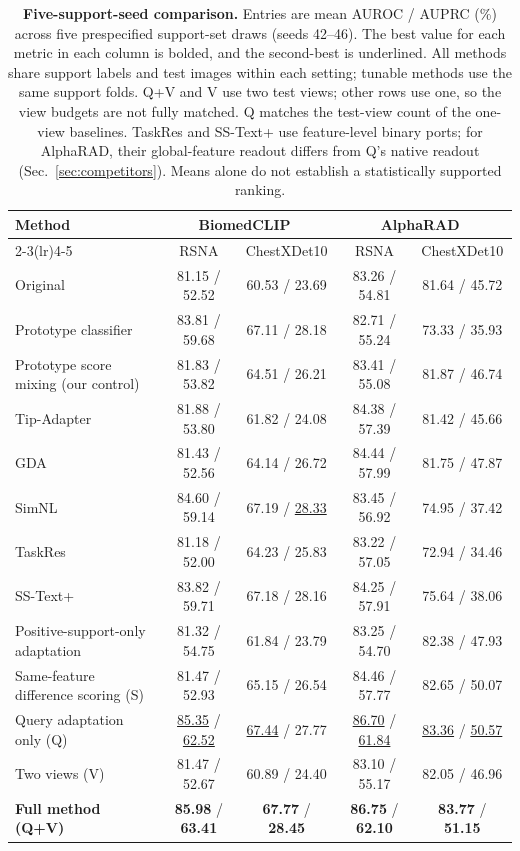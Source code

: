 \begin{table}[t]
\centering
\caption{\textbf{Five-support-seed comparison.} Entries are mean AUROC / AUPRC (\%) across five prespecified support-set draws (seeds 42--46). The best value for each metric in each column is bolded, and the second-best is underlined. All methods share support labels and test images within each setting; tunable methods use the same support folds. Q+V and V use two test views; other rows use one, so the view budgets are not fully matched. Q matches the test-view count of the one-view baselines. TaskRes and SS-Text+ use feature-level binary ports; for AlphaRAD, their global-feature readout differs from Q's native readout (Sec.~\ref{sec:competitors}). Means alone do not establish a statistically supported ranking.}
\label{tab:competitors}
\small
\begin{tabular*}{\textwidth}{@{\extracolsep{\fill}}lcccc}
\toprule
Method & \multicolumn{2}{c}{BiomedCLIP~\cite{biomedclip}} & \multicolumn{2}{c}{AlphaRAD~\cite{alpharad}} \\
\cmidrule(lr){2-3}\cmidrule(lr){4-5}
 & RSNA & ChestXDet10 & RSNA & ChestXDet10 \\
\midrule
Original & 81.15 / 52.52 & 60.53 / 23.69 & 83.26 / 54.81 & 81.64 / 45.72 \\
Prototype classifier~\cite{snell2017prototypical} & 83.81 / 59.68 & 67.11 / 28.18 & 82.71 / 55.24 & 73.33 / 35.93 \\
Prototype score mixing (our control) & 81.83 / 53.82 & 64.51 / 26.21 & 83.41 / 55.08 & 81.87 / 46.74 \\
Tip-Adapter~\cite{tipadapter} & 81.88 / 53.80 & 61.82 / 24.08 & 84.38 / 57.39 & 81.42 / 45.66 \\
GDA~\cite{gda} & 81.43 / 52.56 & 64.14 / 26.72 & 84.44 / 57.99 & 81.75 / 47.87 \\
SimNL~\cite{simnl} & 84.60 / 59.14 & 67.19 / \underline{28.33} & 83.45 / 56.92 & 74.95 / 37.42 \\

TaskRes~\cite{taskres} & 81.18 / 52.00 & 64.23 / 25.83 & 83.22 / 57.05 & 72.94 / 34.46 \\
SS-Text+~\cite{sstextplus} & 83.82 / 59.71 & 67.18 / 28.16 & 84.25 / 57.91 & 75.64 / 38.06 \\
Positive-support-only adaptation & 81.32 / 54.75 & 61.84 / 23.79 & 83.25 / 54.70 & 82.38 / 47.93 \\
Same-feature difference scoring (S) & 81.47 / 52.93 & 65.15 / 26.54 & 84.46 / 57.77 & 82.65 / 50.07 \\
Query adaptation only (Q) & \underline{85.35} / \underline{62.52} & \underline{67.44} / 27.77 & \underline{86.70} / \underline{61.84} & \underline{83.36} / \underline{50.57} \\
Two views (V) & 81.47 / 52.67 & 60.89 / 24.40 & 83.10 / 55.17 & 82.05 / 46.96 \\
\textbf{Full method (Q+V)} & \textbf{85.98} / \textbf{63.41} & \textbf{67.77} / \textbf{28.45} & \textbf{86.75} / \textbf{62.10} & \textbf{83.77} / \textbf{51.15} \\
\bottomrule
\end{tabular*}
\end{table}
